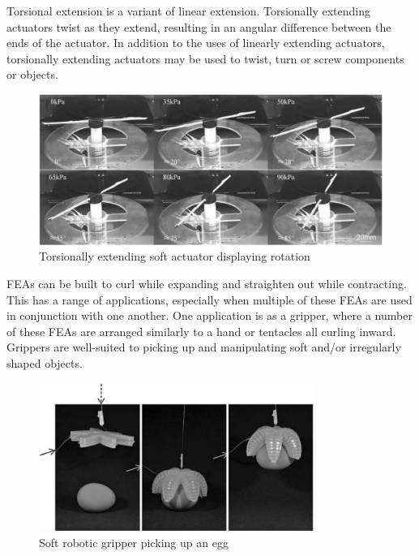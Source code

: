 Torsional extension is a variant of linear extension. Torsionally extending actuators twist as they extend, resulting in an angular difference between the ends of the actuator. In addition to the uses of linearly extending actuators, torsionally extending actuators may be used to twist, turn or screw components or objects. \cite{Yan2018}

\begin{figure}[H]
	\centering
	\includegraphics[width=1\textwidth]{TorsionalExtension.png}
	\caption{Torsionally extending soft actuator displaying rotation \cite{Yan2018}}
	\label{fig:tea}
\end{figure}

FEAs can be built to curl while expanding and straighten out while contracting. This has a range of applications, especially when multiple of these FEAs are used in conjunction with one another. One application is as a gripper, where a number of these FEAs are arranged similarly to a hand or tentacles all curling inward. Grippers are well-suited to picking up and manipulating soft and/or irregularly shaped objects. \cite{Ilievski2011}

\begin{figure}[H]
	\centering
	\includegraphics[width=0.8\textwidth]{Gripper.png}
	\caption{Soft robotic gripper picking up an egg \cite{Ilievski2011}}
	\label{fig:grip}
\end{figure}

